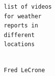 \begin{subfigure}[t]{0.19\textwidth}
\small
\begin{snugshade*}
\begin{verbatim}
list of videos
for weather
reports in
different
locations


\end{verbatim}
\end{snugshade*}
\end{subfigure}
\begin{subfigure}[t]{0.15\textwidth}
\small
\begin{snugshade*}
\begin{verbatim}
Fred LeCrone






\end{verbatim}
\end{snugshade*}
\end{subfigure}
